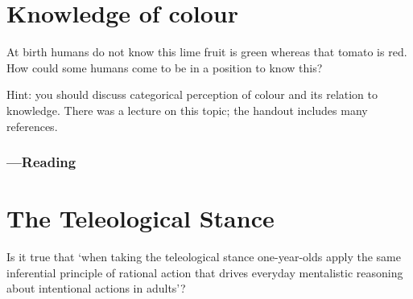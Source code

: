 \documentclass[12pt,\papersize]{extarticle}
\begin{document}





\clearpage



\section{Knowledge of colour}
At birth humans do not know this lime fruit is green whereas that tomato is red.
How could some humans come to be in a position to know this?

Hint: you should discuss categorical perception of colour and its relation to knowledge.  There was a lecture on this topic; the handout includes many references.

\subsubsection{---Reading}







%
%
%
%
%
%
%
%

\clearpage

\section{The Teleological Stance}
Is it true that ‘when taking the teleological stance one-year-olds apply the same inferential principle of rational action that drives everyday mentalistic reasoning about intentional actions in adults’?
\end{document}
